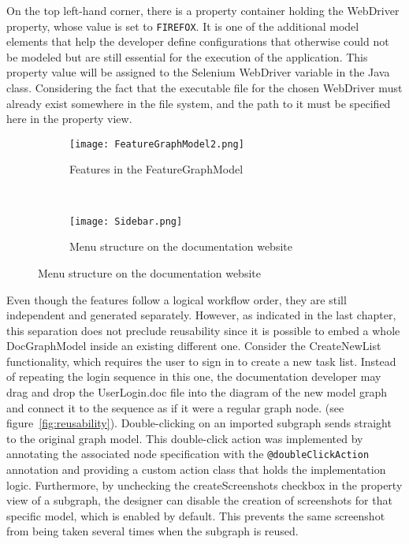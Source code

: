 On the top left-hand corner, there is a property container holding the WebDriver property, whose value is set to \lstinline[language=MGL]{FIREFOX}. It is one of the additional model elements that help the developer define configurations that otherwise could not be modeled but are still essential for the execution of the application. This property value will be assigned to the Selenium WebDriver variable in the Java class. Considering the fact that the executable file for the chosen WebDriver must already exist somewhere in the file system, and the path to it must be specified here in the property view.

\begin{figure}[H]
    \begin{subfigure}[b]{0.5\textwidth}
        \texttt{[image: FeatureGraphModel2.png]}
        \caption{Features in the FeatureGraphModel}
        \label{fig:featGraph}
    \end{subfigure}
    ~
    \begin{subfigure}[b]{0.5\textwidth}
        \texttt{[image: Sidebar.png]}
        \caption{Menu structure on the documentation website}
        \label{fig:sidebar}
    \end{subfigure}
\end{figure}

Even though the features follow a logical workflow order, they are still independent and generated separately. However, as indicated in the last chapter, this separation does not preclude reusability since it is possible to embed a whole DocGraphModel inside an existing different one. Consider the CreateNewList functionality, which requires the user to sign in to create a new task list. Instead of repeating the login sequence in this one, the documentation developer may drag and drop the UserLogin.doc file into the diagram of the new model graph and connect it to the sequence as if it were a regular graph node. (see figure~\ref{fig:reusability}). Double-clicking on an imported subgraph sends straight to the original graph model. This double-click action was implemented by annotating the associated node specification with the \lstinline[language=MGL]{@doubleClickAction} annotation and providing a custom action class that holds the implementation logic. Furthermore, by unchecking the createScreenshots checkbox in the property view of a subgraph, the designer can disable the creation of screenshots for that specific model, which is enabled by default. This prevents the same screenshot from being taken several times when the subgraph is reused.

